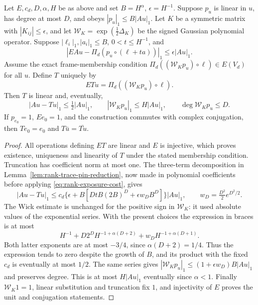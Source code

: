 \begin{lemma}
\label{lem:rank-growing-wick-pin}
Let $E,c_d,D,\alpha,H$ be as above and set $B=H^\alpha$, $\epsilon=H^{-1}$.
Suppose $p_u$ is linear in $u$, has degree at most $D$, and obeys
$|p_u|_1\le B|Au|_1$. Let $K$ be a symmetric matrix with
$|K_{ij}|\le\epsilon$, and let
$\mathcal W_K=\exp(\tfrac12\Delta_K)$ be the signed Gaussian
polynomial operator. Suppose $|\ell_i|_1,|a_i|_1\le B$,
$0<t\le H^{-1}$, and
\[
 |EAu-\Pi_d(p_u\circ(\ell+ta))|_1\le\epsilon|Au|_1.
\]
Assume the exact frame-membership condition
$\Pi_d((\mathcal W_Kp_u)\circ\ell)\in E(V_d)$ for all $u$.
Define $T$ uniquely by
\[
 ETu=\Pi_d((\mathcal W_Kp_u)\circ\ell).
\]
Then $T$ is linear and, eventually,
\[
 |Au-Tu|_1\le\tfrac12|Au|_1,\qquad
 |\mathcal W_Kp_u|_1\le H|Au|_1,
 \qquad\deg\mathcal W_Kp_u\le D.
\]
If $p_{e_0}=1$, $Ee_0=1$, and the construction commutes with complex
conjugation, then $Te_0=e_0$ and $T\bar u=\overline{Tu}$.
\end{lemma}
\begin{proof}
All operations defining $ET$ are linear and $E$ is injective, which
proves existence, uniqueness and linearity of $T$ under the stated
membership condition. Truncation has coefficient norm at most one.
The three-term decomposition in Lemma~\ref{lem:rank-trace-pin-reduction},
now made in polynomial coefficients before applying
\eqref{eq:rank-exposure-cost}, gives
\[
 |Au-Tu|_1\le c_d\{\epsilon+B[DtB(2B)^D+
                       \epsilon w_DB^D]\}|Au|_1,
 \qquad w_D=\tfrac{D^2}{2}e^{D^2/2}.
\]
The Wick estimate is unchanged for the positive sign in
$\mathcal W_K$: it used absolute values of the exponential series.
With the present choices the expression in braces is at most
\[
 H^{-1}+D2^D H^{-1+\alpha(D+2)}
                      +w_D H^{-1+\alpha(D+1)}.
\]
Both latter exponents are at most $-3/4$, since
$\alpha(D+2)=1/4$. Thus the expression tends to zero despite the growth
of $B$, and its product with the fixed $c_d$ is eventually at most
$1/2$. The same series gives
$|\mathcal W_Kp_u|_1\le(1+\epsilon w_D)B|Au|_1$ and preserves degree.
This is at most $H|Au|_1$ eventually since $\alpha<1$.
Finally $\mathcal W_K1=1$, linear substitution and truncation fix $1$,
and injectivity of $E$ proves the unit and conjugation statements.
\end{proof}

